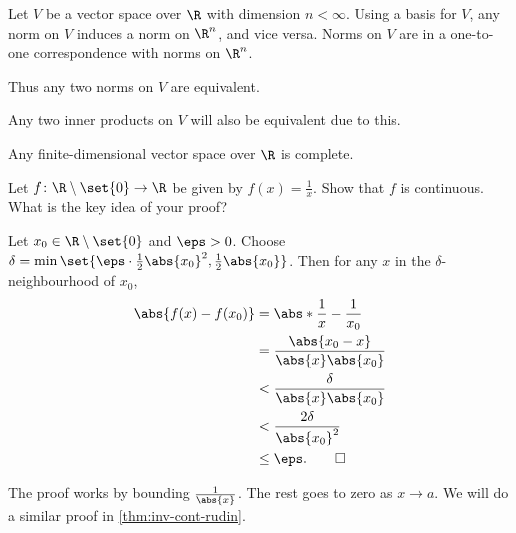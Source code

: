 \begin{remarks}
    \item Let $V$ be a vector space over $\R$ with dimension $n < \infty$.
    Using a basis for $V$, any norm on $V$ induces a norm on $\R^n$,
    and vice versa.
    Norms on $V$ are in a one-to-one correspondence with norms on $\R^n$.
    \item Thus any two norms on $V$ are equivalent.
    \item Any two inner products on $V$ will also be equivalent due to this.
    \item Any finite-dimensional vector space over $\R$ is complete.
\end{remarks}

\begin{exercise*} \label{thm:reciprocal-cont}
    Let $f\colon \R \setminus \set{0} \to \R$ be given by $f(x) = \frac1x$.
    Show that $f$ is continuous.
    What is the key idea of your proof?
\end{exercise*}
\begin{solution}
    Let $x_0 \in \R \setminus \set{0}$ and $\eps > 0$.
    Choose $\delta
    = \min\set{\eps \cdot \frac12\abs{x_0}^2, \frac12 \abs{x_0}}$.
    Then for any $x$ in the $\delta$-neighbourhood of $x_0$, \begin{align*}
        \abs{f(x) - f(x_0)}
            &= \abs*{\frac1x - \frac1{x_0}} \\
            &= \frac{\abs{x_0 - x}}{\abs{x} \abs{x_0}} \\
            &< \frac{\delta}{\abs{x} \abs{x_0}} \\
            &< \frac{2\delta}{\abs{x_0}^2} \\
            &\le \eps. \qedhere
    \end{align*}
\end{solution}
\begin{remark}
    The proof works by bounding $\frac1{\abs{x}}$.
    The rest goes to zero as $x \to a$.
    We will do a similar proof in \cref{thm:inv-cont-rudin}.
\end{remark}
